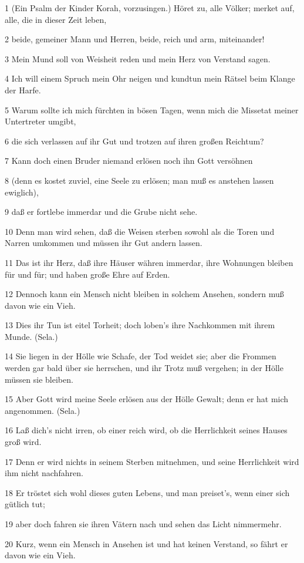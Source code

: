 \par 1 (Ein Psalm der Kinder Korah, vorzusingen.) Höret zu, alle Völker; merket auf, alle, die in dieser Zeit leben,
\par 2 beide, gemeiner Mann und Herren, beide, reich und arm, miteinander!
\par 3 Mein Mund soll von Weisheit reden und mein Herz von Verstand sagen.
\par 4 Ich will einem Spruch mein Ohr neigen und kundtun mein Rätsel beim Klange der Harfe.
\par 5 Warum sollte ich mich fürchten in bösen Tagen, wenn mich die Missetat meiner Untertreter umgibt,
\par 6 die sich verlassen auf ihr Gut und trotzen auf ihren großen Reichtum?
\par 7 Kann doch einen Bruder niemand erlösen noch ihn Gott versöhnen
\par 8 (denn es kostet zuviel, eine Seele zu erlösen; man muß es anstehen lassen ewiglich),
\par 9 daß er fortlebe immerdar und die Grube nicht sehe.
\par 10 Denn man wird sehen, daß die Weisen sterben sowohl als die Toren und Narren umkommen und müssen ihr Gut andern lassen.
\par 11 Das ist ihr Herz, daß ihre Häuser währen immerdar, ihre Wohnungen bleiben für und für; und haben große Ehre auf Erden.
\par 12 Dennoch kann ein Mensch nicht bleiben in solchem Ansehen, sondern muß davon wie ein Vieh.
\par 13 Dies ihr Tun ist eitel Torheit; doch loben's ihre Nachkommen mit ihrem Munde. (Sela.)
\par 14 Sie liegen in der Hölle wie Schafe, der Tod weidet sie; aber die Frommen werden gar bald über sie herrschen, und ihr Trotz muß vergehen; in der Hölle müssen sie bleiben.
\par 15 Aber Gott wird meine Seele erlösen aus der Hölle Gewalt; denn er hat mich angenommen. (Sela.)
\par 16 Laß dich's nicht irren, ob einer reich wird, ob die Herrlichkeit seines Hauses groß wird.
\par 17 Denn er wird nichts in seinem Sterben mitnehmen, und seine Herrlichkeit wird ihm nicht nachfahren.
\par 18 Er tröstet sich wohl dieses guten Lebens, und man preiset's, wenn einer sich gütlich tut;
\par 19 aber doch fahren sie ihren Vätern nach und sehen das Licht nimmermehr.
\par 20 Kurz, wenn ein Mensch in Ansehen ist und hat keinen Verstand, so fährt er davon wie ein Vieh.

